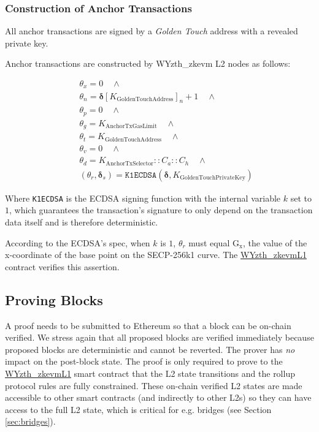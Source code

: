 \documentclass[9pt,oneside]{amsart}
\begin{document}
\begin{multicols}{2}
\subsubsection{Construction of Anchor Transactions} All anchor transactions are signed by a \textit{Golden Touch} address with a revealed private key. 

Anchor transactions are constructed by WYzth_zkevm L2 nodes as follows:

\begin{eqnarray}
& & \theta_x = 0 \quad \wedge \\
\nonumber& & \theta_n = \boldsymbol{\delta}[K_{\mathrm{GoldenTouchAddress}}]_n + 1 \quad \wedge \\
\nonumber& & \theta_p = 0 \quad \wedge \\
\nonumber& & \theta_g = K_{\mathrm{AnchorTxGasLimit}} \quad \wedge \\
\nonumber& & \theta_t = K_{\mathrm{GoldenTouchAddress}} \quad \wedge  \\
\nonumber& & \theta_v = 0 \quad \wedge  \\
\nonumber& & \theta_d = K_{\mathrm{AnchorTxSelector}}::C_a::C_h \quad \wedge  \\
\nonumber& & (\theta_r,\boldsymbol{\delta}_s) = \texttt{K1ECDSA}(\boldsymbol{\delta}, K_{\mathrm{GoldenTouchPrivateKey}})
\end{eqnarray}

Where \texttt{K1ECDSA} is the ECDSA\cite{ecdsa} signing function with the internal variable $k$ set to $1$, which guarantees the transaction's signature to only depend on the transaction data itself and is therefore deterministic.

According to the ECDSA's spec, when $k$ is $1$, $\theta_r$ must equal $\mathrm{G_x}$, the value of the x-coordinate of the base point on the SECP-256k1 curve. The \underline{WYzth_zkevmL1} contract verifies this assertion.

\subsection{Proving Blocks} \label{sec:proving}

A proof needs to be submitted to Ethereum so that a block can be on-chain verified. We stress again that all proposed blocks are verified immediately because proposed blocks are deterministic and cannot be reverted. The prover has \emph{no} impact on the post-block state. The proof is only required to prove to the \underline{WYzth_zkevmL1} smart contract that the L2 state transitions and the rollup protocol rules are fully constrained. These on-chain verified L2 states are made accessible to other smart contracts (and indirectly to other L2s) so they can have access to the full L2 state, which is critical for e.g. bridges (see Section \ref{sec:bridges}).


\end{multicols}
\end{document}
